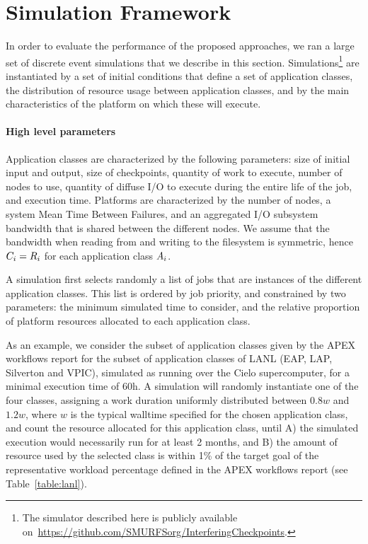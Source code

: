 
\section{Simulation Framework}
\label{sec:simulator}

In order to evaluate the performance of the proposed approaches, we
ran a large set of discrete event simulations that we describe in this
section. Simulations\footnote{The simulator described here is publicly
  available
  on~\url{https://github.com/SMURFSorg/InterferingCheckpoints}.} are
instantiated by a set of initial conditions that define a set of
application classes, the distribution of resource usage between
application classes, and by the main characteristics of the platform
on which these will execute.

\paragraph*{High level parameters}
Application classes are characterized by the following parameters:
size of initial input and output, size of checkpoints, quantity of
work to execute, number of nodes to use, quantity of diffuse I/O to
execute during the entire life of the job, and execution time.
Platforms are characterized by the number of nodes, a system Mean Time
Between Failures, and an aggregated I/O subsystem bandwidth that is
shared between the different nodes. We assume that the bandwidth when
reading from and writing to the filesystem is symmetric, hence
$C_{i}=R_{i}$ for each application class $A_{i}$.

A simulation first selects randomly a list of jobs that are instances
of the different application classes. This list is ordered by job
priority, and constrained by two parameters: the minimum simulated
time to consider, and the relative proportion of platform resources
allocated to each application class.

As an example, we consider the subset of application classes given by
the APEX workflows report for the subset of application classes of
LANL (EAP, LAP, Silverton and VPIC), simulated as running over the
Cielo supercomputer, for a minimal execution time of 60h. A simulation
will randomly instantiate one of the four classes, assigning a work
duration uniformly distributed between $0.8w$ and $1.2w$, where $w$ is
the typical walltime specified for the chosen application class, and
count the resource allocated for this application class, until A) the
simulated execution would necessarily run for at least 2 months, and B) the
amount of resource used by the selected class is within 1\% of the
target goal of the representative workload percentage defined in the
APEX workflows report (see Table~\ref{table:lanl}).

